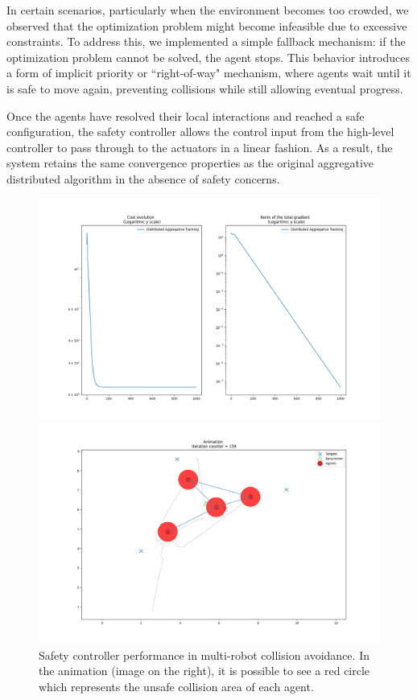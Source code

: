 \medskip
In certain scenarios, particularly when the environment becomes too crowded, we observed that the optimization problem might become infeasible due to excessive constraints. To address this, we implemented a simple fallback mechanism: if the optimization problem cannot be solved, the agent stops. This behavior introduces a form of implicit priority or ``right-of-way" mechanism, where agents wait until it is safe to move again, preventing collisions while still allowing eventual progress.

\medskip
Once the agents have resolved their local interactions and reached a safe configuration, the safety controller allows the control input from the high-level controller to pass through to the actuators in a linear fashion. As a result, the system retains the same convergence properties as the original aggregative distributed algorithm in the absence of safety concerns.

\begin{figure}[H]
  \begin{minipage}{0.5\textwidth}
    \includegraphics[width=\linewidth]{report/figs/safety_contr.png}
  \end{minipage}%
  \hfill
  \begin{minipage}{0.5\textwidth}
    \includegraphics[width=\linewidth]{report/figs/safety_animation.png}
  \end{minipage}%
  \caption{Safety controller performance in multi-robot collision avoidance. In the animation (image on the right), it is possible to see a red circle which represents the unsafe collision area of each agent.}
  \label{fig:rviz_result}
\end{figure}


